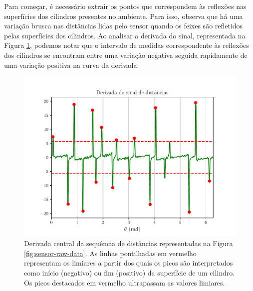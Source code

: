 Para começar, é necessário extrair os pontos que correspondem às reflexões nas 
superfícies dos cilindros presentes no ambiente. Para isso, \cite{youtube-clauss-brenner} observa que há uma variação brusca nas distâncias lidas pelo sensor quando os feixes são 
refletidos pelas superfícies dos cilindros. Ao analisar a derivada do sinal, 
representada na Figura \ref{fig:sensor-derivative}, podemos notar que o intervalo de medidas 
correspondente às reflexões dos cilindros se encontram entre uma variação 
negativa seguida rapidamente de uma variação positiva na curva da derivada.
\begin{figure}[]
  \centering
  \includegraphics[width=.6\textwidth]{figs/signal_derivative.pdf}
  \caption[Deriva do sinal de uma sequência de distâncias lida pelo sensor LiDAR]{Derivada central da sequência de distâncias representadas na Figura \ref{fig:sensor-raw-data}. As linhas pontilhadas em vermelho 
  representam os limiares a partir dos quais os picos são interpretados 
  como início (negativo) ou fim (positivo) da superfície de um cilindro. Os picos destacados 
  em vermelho ultrapassam as valores limiares.}
  \label{fig:sensor-derivative}
\end{figure}


